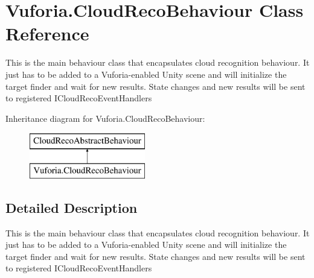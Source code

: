 \hypertarget{class_vuforia_1_1_cloud_reco_behaviour}{}\section{Vuforia.\+Cloud\+Reco\+Behaviour Class Reference}
\label{class_vuforia_1_1_cloud_reco_behaviour}


This is the main behaviour class that encapsulates cloud recognition behaviour. It just has to be added to a Vuforia-\/enabled Unity scene and will initialize the target finder and wait for new results. State changes and new results will be sent to registered I\+Cloud\+Reco\+Event\+Handlers  


Inheritance diagram for Vuforia.\+Cloud\+Reco\+Behaviour\+:\begin{figure}[H]
\begin{center}
\leavevmode
\includegraphics[height=2.000000cm]{class_vuforia_1_1_cloud_reco_behaviour}
\end{center}
\end{figure}


\subsection{Detailed Description}
This is the main behaviour class that encapsulates cloud recognition behaviour. It just has to be added to a Vuforia-\/enabled Unity scene and will initialize the target finder and wait for new results. State changes and new results will be sent to registered I\+Cloud\+Reco\+Event\+Handlers 

